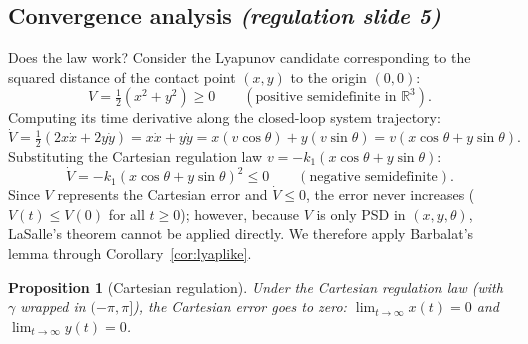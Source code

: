 \documentclass[11pt,a4paper]{article}
\newcommand{\R}{\mathbb{R}}
\theoremstyle{plain}
\newtheorem{proposition}[theorem]{Proposition}
\theoremstyle{definition}
\theoremstyle{remark}
\begin{document}
\subsection{Convergence analysis \emph{(regulation slide 5)}}

Does the law work? Consider the Lyapunov candidate corresponding to the squared distance of the contact point $(x,y)$ to the origin $(0,0)$:
\[
V=\tfrac12(x^2+y^2)\ge0\qquad (\text{positive semidefinite in }\R^3).
\]
Computing its time derivative along the closed-loop system trajectory:
\[
\dot V = \tfrac12(2x\dot x + 2y\dot y) = x\dot x + y\dot y = x(v\cos\theta) + y(v\sin\theta) = v(x\cos\theta + y\sin\theta).
\]
Substituting the Cartesian regulation law $v = -k_1(x\cos\theta + y\sin\theta)$:
\[
\dot V = -k_1(x\cos\theta + y\sin\theta)^2 \le 0\qquad (\text{negative semidefinite}).
\]
Since $V$ represents the Cartesian error and $\dot V\le0$, the error never increases ($V(t)\le V(0)$ for all $t\ge0$); however, because $V$ is only PSD in $(x,y,\theta)$, LaSalle's theorem cannot be applied directly. We therefore apply Barbalat's lemma through Corollary~\ref{cor:lyaplike}.

\begin{proposition}[Cartesian regulation]\label{prop:cart}
Under the Cartesian regulation law (with $\gamma$ wrapped in $(-\pi,\pi]$), the Cartesian error goes to zero: $\lim_{t\to\infty}x(t)=0$ and $\lim_{t\to\infty}y(t)=0$.
\end{proposition}
\end{document}
